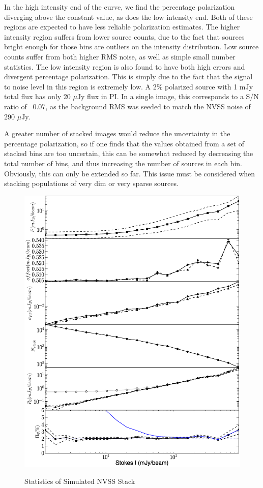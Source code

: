 \documentclass{article}
\begin{document}
In the high intensity end of the curve, we find the percentage polarization 
diverging above the constant value, as does the low intensity end.  Both of 
these regions are expected to have less reliable polarization estimates.  The 
higher intensity region suffers from lower source counts, due to the fact that
sources bright enough for those bins are outliers on the intensity distribution.
Low source counts suffer from both higher RMS noise, as well as simple small 
number statistics.  The low intensity region is also found to have both high
errors and divergent percentage polarization.  This is simply due to the fact 
that the signal to noise level in this region is extremely low.  A 2\% polarized
source with 1 mJy total flux has only 20 $\mu$Jy flux in PI.  In a single image,
this corresponds to a S/N ratio of ~0.07, as the background RMS was seeded to 
match the NVSS noise of 290 $\mu$Jy. \par  

A greater number of stacked images would reduce the uncertainty in the 
percentage polarization, so if one finds that the values obtained from a set of
stacked bins are too uncertain, this can be somewhat reduced by decreasing the 
total number of bins, and thus increasing the number of sources in each bin.  
Obviously, this can only be extended so far.  This issue must be considered when
stacking populations of very dim or very sparse sources.

\begin{figure}[H]
\includegraphics[trim=2cm 0cm 0cm 0cm, clip, scale=0.65]{simulation.eps}\\
\caption[Simulation Stacking Statistics]{Statistics of Simulated NVSS Stack}
\centering
\end{figure}
\end{document}
